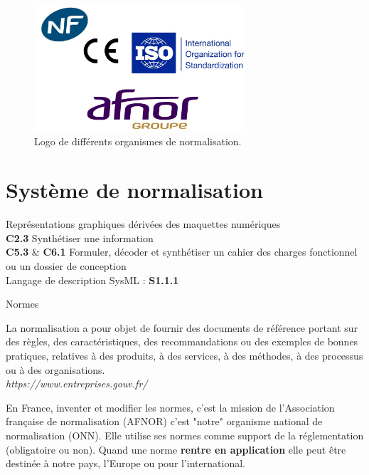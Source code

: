 \documentclass[
	11pt, %
	fleqn, %
	a4paper, %
]{LegrandOrangeBook}
\begin{document}
\begin{figure}[H] %
	\centering %
	\includegraphics[width=0.7\textwidth]{Images/Logo1.JPG} %
	\caption{Logo de différents organismes de normalisation.}
	\label{logo} %
\end{figure}



\section{Système de normalisation}

\begin{corollary}[S2.4] 
Représentations graphiques dérivées des maquettes numériques \\
\textbf{C2.3} Synthétiser une information \\
\textbf{C5.3} \& \textbf{C6.1} Formuler, décoder et synthétiser un cahier des charges fonctionnel ou un dossier de conception \\
Langage de description SysML : \textbf{S1.1.1}


\end{corollary}

\begin{definition}{Normes}

    La normalisation a pour objet de fournir des documents de référence portant sur des règles, des caractéristiques, des recommandations ou des exemples de bonnes pratiques, relatives à des produits, à des services, à des méthodes, à des processus ou à des organisations.\\ \textit{https://www.entreprises.gouv.fr/}
\end{definition}


En France, inventer et modifier les normes, c'est la mission de l’Association française de normalisation (AFNOR) c'est "notre" organisme national de normalisation (ONN).  Elle utilise ses normes comme support de la réglementation (obligatoire ou non). Quand une norme \textbf{rentre en application} elle peut être destinée à notre pays, l'Europe ou pour l'international.
\end{document}
